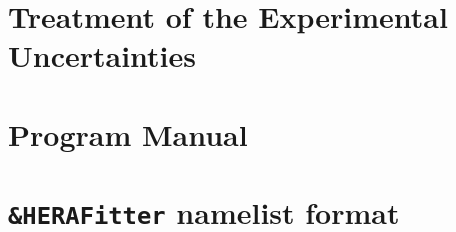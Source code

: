 \documentclass[11pt,a4paper]{article}
\begin{document}


\section{Treatment of the Experimental Uncertainties}


\section{Program Manual}




\appendix

\section{{\tt \&HERAFitter} namelist format}
\end{document}
